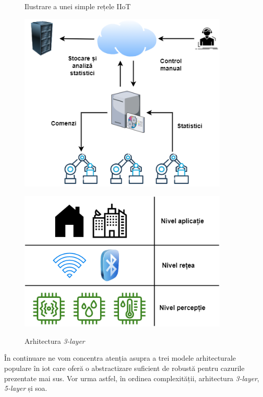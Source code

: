 \begin{figure}
    \centering
    \begin{minipage}{0.45\textwidth}
        \caption{Ilustrare a unei simple rețele IIoT}
        \centering
        \includegraphics[width=0.9\textwidth]{images/exemplu_retea_iot_Cap3.drawio.png}
        \label{fig:exemplu_iiot}
    \end{minipage}\hfill
    \begin{minipage}{0.45\textwidth}
        \caption{Arhitectura \textit{3-layer}}
        \centering
        \includegraphics[width=0.9\textwidth]{images/3_layer.drawio.png}
        \label{fig:arch_3layer}
    \end{minipage}
\end{figure}

În continuare ne vom concentra atenția asupra a trei modele arhitecturale populare în \acrshort{iot} care oferă o abstractizare suficient de robustă pentru cazurile prezentate mai sus. Vor urma astfel, în ordinea complexității, arhitectura \textit{3-layer}, \textit{5-layer} și \acrlong{soa}.

